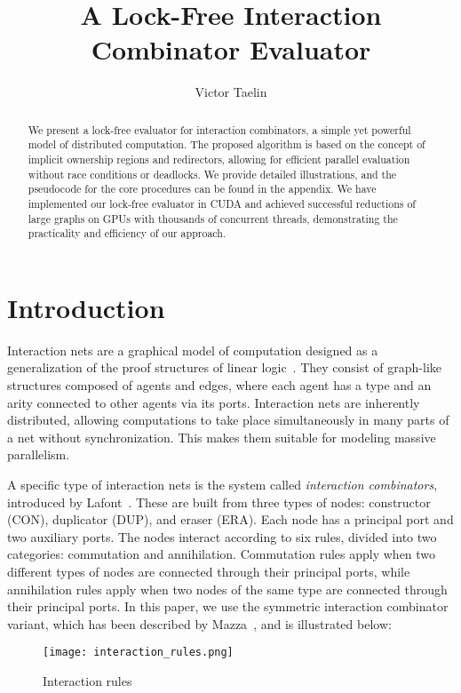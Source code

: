 \documentclass{article}
\title{A Lock-Free Interaction Combinator Evaluator}
\author{Victor Taelin}
\date{}
\begin{document}
\maketitle

\begin{abstract}
We present a lock-free evaluator for interaction combinators, a simple yet powerful model of distributed computation. The proposed algorithm is based on the concept of implicit ownership regions and redirectors, allowing for efficient parallel evaluation without race conditions or deadlocks. We provide detailed illustrations, and the pseudocode for the core procedures can be found in the appendix. We have implemented our lock-free evaluator in CUDA and achieved successful reductions of large graphs on GPUs with thousands of concurrent threads, demonstrating the practicality and efficiency of our approach.
\end{abstract}

\section{Introduction}\label{s:introduction}

Interaction nets are a graphical model of computation designed as a generalization of the proof structures of linear logic~\cite{girard1987linear}. They consist of graph-like structures composed of agents and edges, where each agent has a type and an arity connected to other agents via its ports. Interaction nets are inherently distributed, allowing computations to take place simultaneously in many parts of a net without synchronization. This makes them suitable for modeling massive parallelism.

A specific type of interaction nets is the system called \textit{interaction combinators}, introduced by Lafont~\cite{lafont1997interaction}. These are built from three types of nodes: constructor (CON), duplicator (DUP), and eraser (ERA). Each node has a principal port and two auxiliary ports. The nodes interact according to six rules, divided into two categories: commutation and annihilation. Commutation rules apply when two different types of nodes are connected through their principal ports, while annihilation rules apply when two nodes of the same type are connected through their principal ports. In this paper, we use the symmetric interaction combinator variant, which has been described by Mazza~\cite{mazza2007denotational}, and is illustrated below:

\begin{figure}[h!]
\centering
\texttt{[image: interaction\_rules.png]}
\caption{Interaction rules}
\end{figure}
\end{document}

